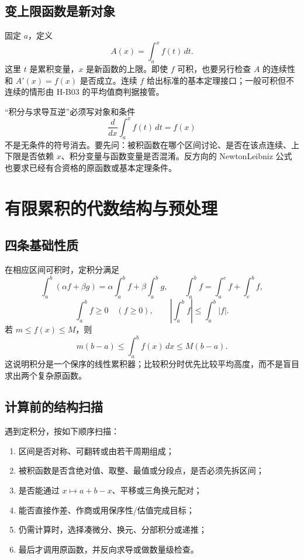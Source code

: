 \documentclass[11pt,a4paper,fontset=fandol]{ctexart}
\begin{document}
\subsection{变上限函数是新对象}

固定 $a$，定义
\[
A(x)=\int_a^x f(t)\,dt.
\]
这里 $t$ 是累积变量，$x$ 是新函数的上限。即使 $f$ 可积，也要另行检查 $A$ 的连续性和 $A'(x)=f(x)$ 是否成立。连续 $f$ 给出标准的基本定理接口；一般可积但不连续的情形由 H-B03 的平均值商判据接管。

\begin{warnbox}{“积分与求导互逆”必须写对象和条件}
\[
\frac{d}{dx}\int_a^x f(t)\,dt=f(x)
\]
不是无条件的符号消去。要先问：被积函数在哪个区间讨论、是否在该点连续、上下限是否依赖 $x$、积分变量与函数变量是否混淆。反方向的 Newton\textendash{}Leibniz 公式也要求已经有合资格的原函数或基本定理条件。
\end{warnbox}

\section{有限累积的代数结构与预处理}

\subsection{四条基础性质}

在相应区间可积时，定积分满足
\[
\int_a^b(\alpha f+\beta g)=\alpha\int_a^b{f}+\beta\int_a^b{g},
\qquad
\int_a^b{f}=\int_a^c{f}+\int_c^b{f},
\]
\[
\int_a^b{f}\ge0\quad(f\ge0),
\qquad
\left\lvert\int_a^b{f}\right\rvert\le\int_a^b{\lvert f\rvert}.
\]
若 $m\le f(x)\le M$，则
\[
m(b-a)\le\int_a^b{f(x)}\,dx\le M(b-a).
\]
这说明积分是一个保序的线性累积器；比较积分时优先比较平均高度，而不是盲目求出两个复杂原函数。

\subsection{计算前的结构扫描}

遇到定积分，按如下顺序扫描：
\begin{enumerate}
  \item 区间是否对称、可翻转或由若干周期组成；
  \item 被积函数是否含绝对值、取整、最值或分段点，是否必须先拆区间；
  \item 是否能通过 $x\mapsto a+b-x$、平移或三角换元配对；
  \item 能否直接作差、作商或用保序性/估值完成目标；
  \item 仍需计算时，选择凑微分、换元、分部积分或递推；
  \item 最后才调用原函数，并反向求导或做数量级检查。
\end{enumerate}
\end{document}
